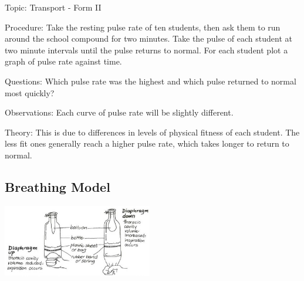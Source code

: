 \begin{multicols}{2}
\begin{description*}
\item[Topic:]{Transport - Form II}
\item[Procedure:]{Take the resting pulse rate of ten students, then ask them to run around the school
compound for two minutes. Take the pulse of each student at two minute intervals until the
pulse returns to normal. For each student plot a graph of pulse rate against time.}
\item[Questions:]{Which pulse rate was the highest and which pulse returned to normal most quickly?}
\item[Observations:]{Each curve of pulse rate will be slightly different.}
\item[Theory:]{This is due to differences in levels of physical fitness of each student. The less fit ones
generally reach a higher pulse rate, which takes longer to return to normal.}
\end{description*}

\subsection{Breathing Model} %

\begin{center}
\includegraphics[width=0.49\textwidth]{./img/vso/breathing-model.jpg}
\end{center}


\end{multicols}
